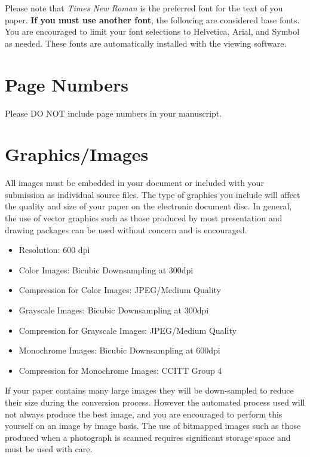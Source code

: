 \documentclass[10pt]{article}
\begin{document}
Please note that {\em Times New Roman} is the preferred font for the text of you paper. \textbf{If you must use another font}, the following are considered base fonts.  You are encouraged to limit your font selections to Helvetica, Arial, and Symbol as needed. These fonts are automatically installed with the viewing software.

\section{Page Numbers}

Please DO NOT include page numbers in your manuscript.



\section{Graphics/Images}

All images must be embedded in your document or included with your submission as individual source files. The type of graphics you include will affect the quality and size of your paper on the electronic document disc. In general, the use of vector graphics such as those produced by most presentation and drawing packages can be used without concern and is encouraged.

\begin{itemize}
    \item Resolution: 600 dpi
    \item Color Images: Bicubic Downsampling at 300dpi
    \item Compression for Color Images: JPEG/Medium Quality
    \item Grayscale Images: Bicubic Downsampling at 300dpi
    \item Compression for Grayscale Images: JPEG/Medium Quality
    \item Monochrome Images: Bicubic Downsampling at 600dpi
    \item Compression for Monochrome Images: CCITT Group 4
\end{itemize}

If your paper contains many large images they will be down-sampled to reduce their size during the conversion process.  However the automated process used will not always produce the best image, and you are encouraged to perform this yourself on an image by image basis. The use of bitmapped images such as those produced when a photograph is scanned requires significant storage space and must be used with care.
\end{document}
